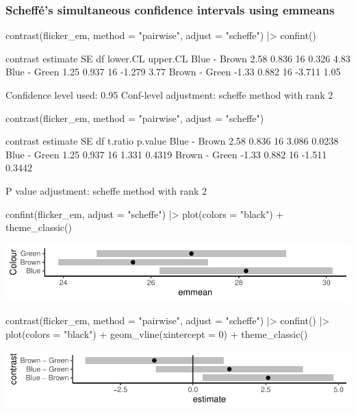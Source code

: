 \documentclass[a4paper]{article}
\begin{document}
\subsubsection{Scheffé's simultaneous confidence intervals using emmeans}
\begin{Schunk}
\begin{Sinput}
contrast(flicker_em, method = "pairwise", adjust = "scheffe") |> confint()
\end{Sinput}
\begin{Soutput}
 contrast      estimate    SE df lower.CL upper.CL
 Blue - Brown      2.58 0.836 16    0.326     4.83
 Blue - Green      1.25 0.937 16   -1.279     3.77
 Brown - Green    -1.33 0.882 16   -3.711     1.05

Confidence level used: 0.95 
Conf-level adjustment: scheffe method with rank 2 
\end{Soutput}
\begin{Sinput}
contrast(flicker_em, method = "pairwise", adjust = "scheffe")
\end{Sinput}
\begin{Soutput}
 contrast      estimate    SE df t.ratio p.value
 Blue - Brown      2.58 0.836 16   3.086  0.0238
 Blue - Green      1.25 0.937 16   1.331  0.4319
 Brown - Green    -1.33 0.882 16  -1.511  0.3442

P value adjustment: scheffe method with rank 2 
\end{Soutput}
\begin{Sinput}
confint(flicker_em, adjust = "scheffe") |> plot(colors = "black") + theme_classic()
\end{Sinput}


{\centering \includegraphics[width=\maxwidth]{figure/listings-unnamed-chunk-256-1} 

}

\begin{Sinput}
contrast(flicker_em, method = "pairwise", adjust = "scheffe") |> confint() |> plot(colors = "black") + 
   geom_vline(xintercept = 0) + theme_classic()
\end{Sinput}


{\centering \includegraphics[width=\maxwidth]{figure/listings-unnamed-chunk-256-2} 

}

\end{Schunk}
\end{document}
